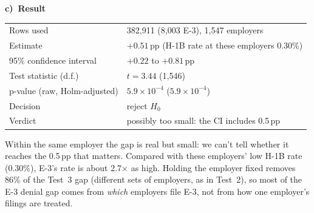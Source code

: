 \documentclass[10pt,a4paper,twocolumn]{article}
\newcommand{\tpart}[2]{\par\needspace{12\baselineskip}\smallskip\textbf{#1)~#2}\par}
\begin{document}
\tpart{c}{Result}
{\small
\begin{tabularx}{\linewidth}{@{}K{3.4cm} Y@{}}
\toprule
Rows used & 382{,}911 (8{,}003 E-3), 1{,}547 employers \\
Estimate & $+0.51$\,pp (H-1B rate at these employers 0.30\%) \\
95\% confidence interval & $+0.22$ to $+0.81$\,pp \\
Test statistic (d.f.) & $t=3.44$ (1{,}546) \\
p-value (raw, Holm-adjusted) & $5.9\times10^{-4}$ ($5.9\times10^{-4}$) \\
Decision & reject $H_0$ \\
Verdict & possibly too small: the CI includes 0.5\,pp \\
\bottomrule
\end{tabularx}}

Within the same employer the gap is real but small: we can't tell whether it reaches the 0.5\,pp
that matters. Compared with these employers' low H-1B rate (0.30\%), E-3's rate is about
2.7$\times$ as high. Holding the employer fixed removes 86\% of the Test~3 gap (different sets of
employers, as in Test~2), so most of the E-3 denial gap comes from \emph{which} employers file
E-3, not from how one employer's filings are treated.

\end{document}
